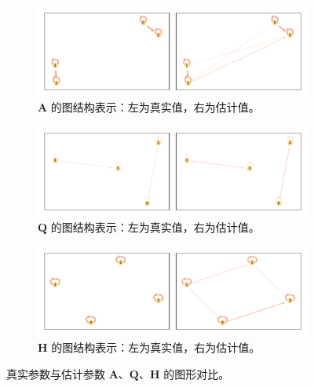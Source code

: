 \begin{figure}[tb]
    \centering
    \begin{subfigure}[b]{0.85\textwidth}
        \includegraphics[width=\textwidth]{fig/A_graphs_for_true_and_EM.pdf}
        \caption{\(\mathbf{A}\) 的图结构表示：左为真实值，右为估计值。}
        \label{fig:subfig1}
    \end{subfigure}
    
    \begin{subfigure}[b]{0.85\textwidth}
        \includegraphics[width=\textwidth]{fig/Q_graphs_for_true_and_EM.pdf}
        \caption{\(\mathbf{Q}\) 的图结构表示：左为真实值，右为估计值。}
        \label{fig:subfig2}
    \end{subfigure}

    \begin{subfigure}[b]{0.85\textwidth}
    \includegraphics[width=\textwidth]{fig/H_graphs_for_true_and_EM.pdf}
    \caption{\(\mathbf{H}\) 的图结构表示：左为真实值，右为估计值。}
    \end{subfigure}
    \caption{真实参数与估计参数 \(\mathbf{A}\)、\(\mathbf{Q}\)、\(\mathbf{H}\) 的图形对比。}
    \label{fig: exp car graph comparison}
\end{figure}

